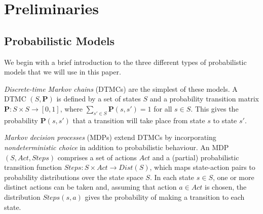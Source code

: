 \documentclass{llncs}
\begin{document}
\section{Preliminaries}



\subsection{Probabilistic Models}

We begin with a brief introduction to the three different types of probabilistic models
that we will use in this paper.

\emph{Discrete-time Markov chains} (DTMCs) are the simplest of these models.
A DTMC $(S,\mathbf{P})$ is defined by a set of states $S$ and a probability transition matrix
$\mathbf{P} : S\times S \rightarrow [0, 1]$, where $\sum_{s'\in S} \mathbf{P}(s, s') = 1$ for all $s \in  S$.
This gives the probability $\mathbf{P}(s, s')$ that a transition will take place from state $s$ to state $s'$.

\emph{Markov decision processes} (MDPs) extend DTMCs by incorporating \emph{nondeterministic choice}
in addition to probabilistic behaviour.
An MDP $(S,Act,Steps)$ comprises a set of actions $Act$
and a (partial) probabilistic transition function $Steps:S\times Act\rightarrow Dist(S)$,
which maps state-action pairs to probability distributions over the state space $S$.
In each state $s\in S$, one or more distinct actions can be taken and, assuming that action $a\in Act$ is chosen,
the distribution $Steps(s,a)$ gives the probability of making a transition to each state.

\end{document}
